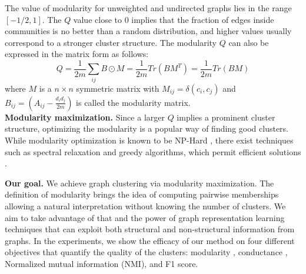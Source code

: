 The value of modularity for unweighted and undirected graphs lies in the range $[-1/2,1]$. %
The $Q$ value close to $0$ implies
that the fraction of edges inside communities is no better than a random distribution, and higher values usually correspond to a stronger cluster structure.
The modularity $Q$ can also be expressed in the matrix form as follows:
\begin{equation}
\label{eq:q_matrix}
    Q= \frac{1}{2m} \sum_{ij} B \odot M = \frac{1}{2m} Tr(B M^T)=\frac{1}{2m} Tr(B M)    
\end{equation}
where $M$ is a $n\times n$ symmetric matrix with $M_{ij} = \delta (c_i, c_j)$ and $B_{ij}= (A_{ij}-\frac{d_id_j}{2m})$ is called the modularity matrix.\\

\textbf{Modularity maximization. } %
Since a larger $Q$ implies a prominent cluster structure, optimizing the modularity is a popular way of finding good clusters. While modularity optimization is known to be NP-Hard \cite{brandes2006maximizing}, there exist techniques such as spectral relaxation and greedy algorithms, which permit efficient solutions \cite{newman2006finding,blondel2008fast}.

\textbf{Our goal.} We achieve graph clustering via modularity maximization. The definition of modularity brings the idea of computing pairwise memberships allowing a natural interpretation without knowing the number of clusters. We aim to take advantage of that and the power of graph representation learning techniques that can exploit both structural and non-structural information from graphs. In the experiments, we show the efficacy of our method on four different objectives that quantify the quality of the clusters: modularity \cite{newman2006modularity}, conductance \cite{yang2012defining}, Normalized mutual information (NMI), and F1 score. %










